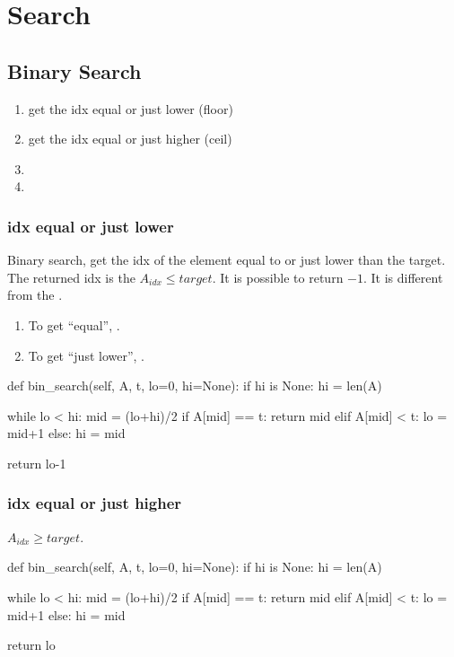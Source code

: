 \chapter{Search}

\section{Binary Search}
\begin{enumerate}
\item get the idx equal or just lower (floor)
\item get the idx equal or just higher (ceil)
\item {}
\item {} 
\end{enumerate}
\subsection{idx equal or just lower}
Binary search, get the idx of the element equal to or just lower than the target. The returned idx is the $A_{idx} \leq target$. It is possible to return $-1$. It is different from the .

\begin{enumerate}
\item To get ``equal'', .
\item To get ``just lower'', .
\end{enumerate}
\begin{python}
def bin_search(self, A, t, lo=0, hi=None):
    if hi is None: hi = len(A)
    
    while lo < hi:
        mid = (lo+hi)/2
        if A[mid] == t:  return mid
        elif A[mid] < t: lo = mid+1
        else:            hi = mid

    return lo-1
\end{python}
\subsection{idx equal or just higher}
$A_{idx} \geq target$.
\begin{python}
def bin_search(self, A, t, lo=0, hi=None):
    if hi is None: hi = len(A)
   
    while lo < hi:
        mid = (lo+hi)/2
        if A[mid] == t:  return mid
        elif A[mid] < t: lo = mid+1
        else:            hi = mid
        
    return lo
\end{python}
